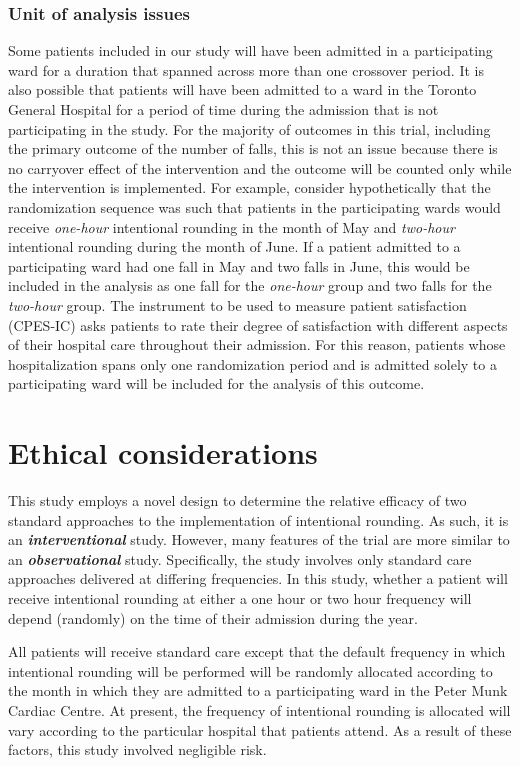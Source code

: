 \documentclass[12pt]{article}
\begin{document}
 \subsubsection{Unit of analysis issues}
 Some patients included in our study will have been admitted in a participating ward for a duration that spanned across more than one crossover period. It is also possible that patients will have been admitted to a ward in the Toronto General Hospital for a period of time during the admission that is not participating in the study. For the majority of outcomes in this trial, including the primary outcome of the number of falls, this is not an issue because there is no carryover effect of the intervention and the outcome will be counted only while the intervention is implemented. For example, consider hypothetically that the randomization sequence was such that patients in the participating wards would receive \textit{one-hour} intentional rounding in the month of May and \textit{two-hour} intentional rounding during the month of June. If a patient admitted to a participating ward had one fall in May and two falls in June, this would be included in the analysis as one fall for the \textit{\textit{one-hour}} group and two falls for the \textit{two-hour} group. 
 The instrument to be used to measure patient satisfaction (CPES-IC) asks patients to rate their degree of satisfaction with different aspects of their hospital care throughout their admission. For this reason, patients whose hospitalization spans only one randomization period and is admitted solely to a participating ward will be included for the analysis of this outcome. 
 
 \section{Ethical considerations}
 
This study employs a novel design to determine the relative efficacy of two standard approaches to the implementation of intentional rounding. As such, it is an \textbf{\textit{interventional}} study. However, many features of the trial are more similar to an \textbf{\textit{observational}} study. Specifically, the study involves only standard care approaches delivered at differing frequencies. In this study, whether a patient will receive intentional rounding at either a one hour or two hour frequency will depend (randomly) on the time of their admission during the year. 

All patients will receive standard care except that the default frequency in which intentional rounding will be performed will be randomly allocated according to the month in which they are admitted to a participating ward in the Peter Munk Cardiac Centre. At present, the frequency of intentional rounding is allocated will vary according to the particular hospital that patients attend. As a result of these factors, this study involved negligible risk. 
\end{document}
